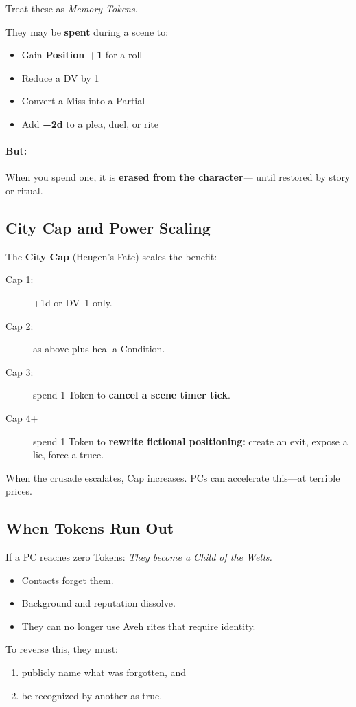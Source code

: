 \documentclass[11pt]{article}
\begin{document}
Treat these as \emph{Memory Tokens}.

They may be \textbf{spent} during a scene to:
\begin{itemize}
  \item Gain \textbf{Position +1} for a roll
  \item Reduce a DV by 1
  \item Convert a Miss into a Partial
  \item Add \textbf{+2d} to a plea, duel, or rite
\end{itemize}

\paragraph{But:} When you spend one, it is \textbf{erased from the character}---
until restored by story or ritual.

\subsection*{City Cap and Power Scaling}
The \textbf{City Cap} (Heugen's Fate) scales the benefit:
\begin{description}
  \item[Cap 1:] +1d or DV--1 only.
  \item[Cap 2:] as above plus heal a Condition.
  \item[Cap 3:] spend 1 Token to \textbf{cancel a scene timer tick}.
  \item[Cap 4+] spend 1 Token to \textbf{rewrite fictional positioning:}
  create an exit, expose a lie, force a truce.
\end{description}

When the crusade escalates, Cap increases. PCs can accelerate this---at terrible prices.

\subsection*{When Tokens Run Out}
If a PC reaches zero Tokens:
\textit{They become a Child of the Wells.}
\begin{itemize}
  \item Contacts forget them.
  \item Background and reputation dissolve.
  \item They can no longer use Aveh rites that require identity.
\end{itemize}

To reverse this, they must:
\begin{enumerate}
  \item publicly name what was forgotten, and
  \item be recognized by another as true.
\end{enumerate}
\end{document}
